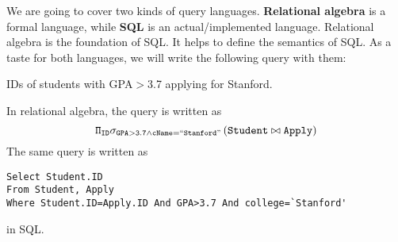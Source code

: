 We are going to cover two kinds of query languages. \textbf{Relational algebra} is a formal language, while \textbf{SQL} is an actual/implemented language. Relational algebra is the foundation of SQL. It helps to define the semantics of SQL. As a taste for both languages, we will write the following query with them:
\begin{center}
IDs of students with GPA$>$3.7 applying for Stanford. 
\end{center}
In relational algebra, the query is written as
\begin{equation*}
\mathtt{\Pi_{ID}\sigma_{GPA>3.7\land cName=``Stanford"}\left(Student\bowtie Apply\right)}
\end{equation*}
The same query is written as 
\begin{lstlisting}
Select Student.ID
From Student, Apply
Where Student.ID=Apply.ID And GPA>3.7 And college=`Stanford' 
\end{lstlisting}
in SQL.
\ifx\PREAMBLE\undefined

\fi